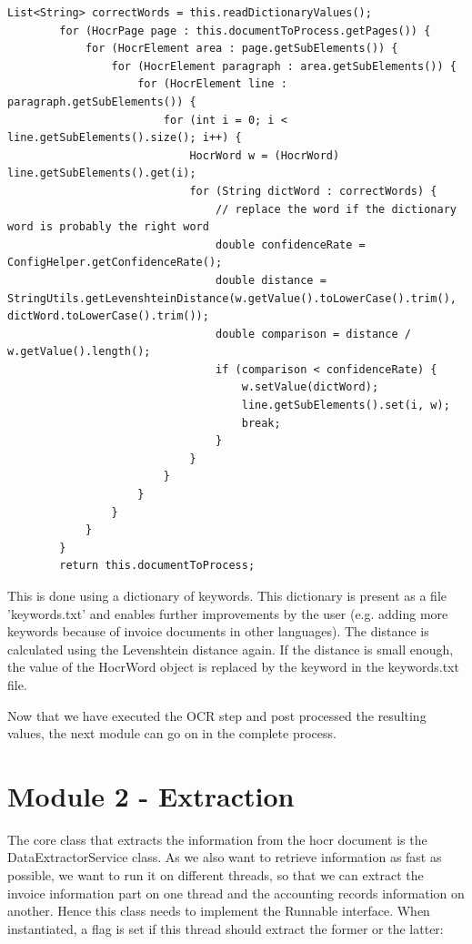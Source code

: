 \begin{lstlisting}[caption={Postprocessing the hocr document}]
        List<String> correctWords = this.readDictionaryValues();
        for (HocrPage page : this.documentToProcess.getPages()) {
            for (HocrElement area : page.getSubElements()) {
                for (HocrElement paragraph : area.getSubElements()) {
                    for (HocrElement line : paragraph.getSubElements()) {
                        for (int i = 0; i < line.getSubElements().size(); i++) {
                            HocrWord w = (HocrWord) line.getSubElements().get(i);
                            for (String dictWord : correctWords) {
                                // replace the word if the dictionary word is probably the right word
                                double confidenceRate = ConfigHelper.getConfidenceRate();
                                double distance = StringUtils.getLevenshteinDistance(w.getValue().toLowerCase().trim(), dictWord.toLowerCase().trim());
                                double comparison = distance / w.getValue().length();
                                if (comparison < confidenceRate) {
                                    w.setValue(dictWord);
                                    line.getSubElements().set(i, w);
                                    break;
                                }
                            }
                        }
                    }
                }
            }
        }
        return this.documentToProcess;
\end{lstlisting}

This is done using a dictionary of keywords. This dictionary is present as a file 'keywords.txt' and enables further improvements by the user (e.g. adding more keywords because of invoice documents in other languages).
The distance is calculated using the Levenshtein distance again. If the distance is small enough, the value of the HocrWord object is replaced by the keyword in the keywords.txt file.

Now that we have executed the OCR step and post processed the resulting values, the next module can go on in the complete process.

\section{Module 2 - Extraction}
\label{sec5.5}

The core class that extracts the information from the hocr document is the DataExtractorService class. As we also want to retrieve information as fast as possible, we want to run it on different threads, so that we can extract the invoice information part on one thread and the accounting records information on another. Hence this class needs to implement the Runnable interface. When instantiated, a flag is set if this thread should extract the former or the latter:

